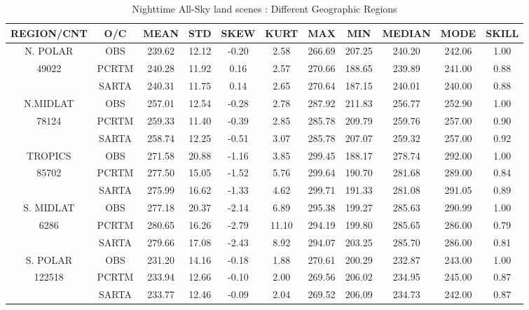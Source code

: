 \documentclass[agupp]{aguplus}              %
\begin{document}
\begin{article}
\begin{center}
\begin{table}[ht]
{\small
\hfill{}
\begin{tabular}{ccccccccccc} %
\hline\hline %
 REGION/CNT    & O/C & MEAN  & STD & SKEW & KURT & MAX & MIN & MEDIAN & MODE & SKILL \\
\hline %
N. POLAR  & OBS   & 239.62 & 12.12  & -0.20 &  2.58 & 266.69 & 207.25 & 240.20 & 242.06 &  1.00 \\
   49022        & PCRTM & 240.28 & 11.92  &  0.16 &  2.57 & 270.66 & 188.65 & 239.89 & 241.00 &  0.88\\ 
              & SARTA & 240.31 & 11.75  &  0.14 &  2.65 & 270.64 & 187.15 & 240.01 & 240.00 &  0.88 \\
\hline
 N.MIDLAT     & OBS   & 257.01 & 12.54  & -0.28 &  2.78 & 287.92 & 211.83 & 256.77 & 252.90 &  1.00 \\
   78124        & PCRTM & 259.33 & 11.40  & -0.39 &  2.85 & 285.78 & 209.79 & 259.76 & 257.00 &  0.90 \\
              & SARTA & 258.74 & 12.25  & -0.51 &  3.07 & 285.78 & 207.07 & 259.32 & 257.00 &  0.92 \\
\hline
TROPICS   & OBS   & 271.58 & 20.88  & -1.16 &  3.85 & 299.45 & 188.17 & 278.74 & 292.00 &  1.00 \\
   85702        & PCRTM & 277.50 & 15.05  & -1.52 &  5.76 & 299.64 & 190.70 & 281.68 & 289.00 &  0.84 \\
              & SARTA & 275.99 & 16.62  & -1.33 &  4.62 & 299.71 & 191.33 & 281.08 & 291.05 &  0.89 \\
\hline
S. MIDLAT   & OBS   & 277.18 & 20.37  & -2.14 &  6.89 & 295.38 & 199.27 & 285.63 & 290.99 &  1.00 \\
   6286        & PCRTM & 280.65 & 16.26  & -2.79 & 11.10 & 294.19 & 199.80 & 285.65 & 286.00 &  0.79 \\ 
              & SARTA & 279.66 & 17.08  & -2.43 &  8.92 & 294.07 & 203.25 & 285.70 & 286.00 &  0.81 \\
\hline
S. POLAR   & OBS   & 231.20 & 14.16  & -0.18 &  1.88 & 270.61 & 200.29 & 232.87 & 243.00 &  1.00 \\
   122518        & PCRTM & 233.94 & 12.66  & -0.10 &  2.00 & 269.56 & 206.02 & 234.95 & 245.00 &  0.87 \\
              & SARTA & 233.77 & 12.46  & -0.09 &  2.04 & 269.52 & 206.09 & 234.73 & 242.00 &  0.87 \\
\hline %
\end{tabular}}
\hfill{}
\caption{Nighttime All-Sky land scenes : Different Geographic Regions}
\label{table:georegions_land} %
\end{table}
\end{center}


\end{article}
\end{document}
